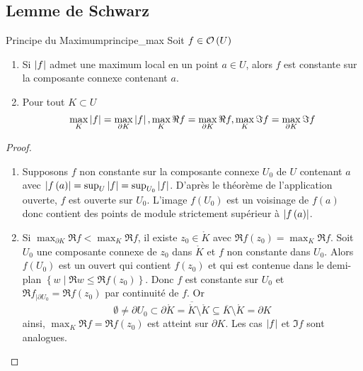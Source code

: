 \documentclass{cours}
\begin{document}
\subsection{Lemme de Schwarz}
\begin{théorème}{Principe du Maximum}{principe_max}
    Soit $f \in \mathcal{O}\left(U\right)$
    \begin{enumerate}
        \item Si $\left|f\right|$ admet une maximum local en un point $a \in U$, alors $f$ est constante sur la composante connexe contenant $a$. 
        \item Pour tout $K \subset U$
        \begin{equation*}
            \max_{K}\left|f\right| = \max_{\partial K}\left|f\right|, \max_{K}\Re f = \max_{\partial K}\Re f, \max_{K}\Im f = \max_{\partial K} \Im f
        \end{equation*}
    \end{enumerate}
\end{théorème}
\begin{proof}
    \begin{enumerate}
        \item Supposons $f$ non constante sur la composante connexe $U_{0}$ de $U$ contenant $a$ avec $\left|f\left(a\right)\right| = \sup_{U}\left|f\right| = \sup_{U_{0}}\left|f\right|$. D'après le théorème de l'application ouverte, $f$ est ouverte sur $U_{0}$. L'image $f\left(U_{0}\right)$ est un voisinage de $f\left(a\right)$ donc contient des points de module strictement supérieur à $\left|f\left(a\right)\right|$.
        \item Si $\max_{\partial K}\Re f < \max_{K}\Re f$, il existe $z_{0} \in \mathring{K}$ avec $\Re f\left(z_{0}\right) = \max_{K}\Re f$. Soit $U_{0}$ une composante connexe de $z_{0}$ dans $\mathring{K}$ et $f$ non constante dans $U_{0}$. Alors $f\left(U_{0}\right)$ est un ouvert qui contient $f\left(z_{0}\right)$ et qui est contenue dans le demi-plan $\left\{w\mid \Re w \leq \Re f\left(z_{0}\right)\right\}$. Donc $f$ est constante sur $U_{0}$ et $\Re f_{\mid \partial U_{0}} = \Re f\left(z_{0}\right)$ par continuité de $f$. Or
        \begin{equation*}
            \emptyset \neq \partial U_{0} \subset \partial \mathring{K} = \overline{\mathring{K}} \setminus \mathring{K} \subseteq \overline{K} \setminus \mathring{K} = \partial K
        \end{equation*}
        ainsi, $\max_{K}\Re f = \Re f\left(z_{0}\right)$ est atteint sur $\partial K$. Les cas $\left|f\right|$ et $\Im f$ sont analogues. 
    \end{enumerate}
\end{proof}
\end{document}

